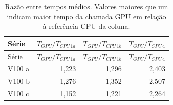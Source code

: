 \begin{longtable}{lrrr}
\caption{Razão entre tempos médios. Valores maiores que um indicam maior tempo da chamada GPU em relação à referência CPU da coluna.}\label{tab:comparacao}\\
\toprule Série & $T_{GPU}/T_{CPU\,1a}$ & $T_{GPU}/T_{CPU\,1b}$ & $T_{GPU}/T_{CPU\,4}$\\
\midrule\endfirsthead
\toprule Série & $T_{GPU}/T_{CPU\,1a}$ & $T_{GPU}/T_{CPU\,1b}$ & $T_{GPU}/T_{CPU\,4}$\\
\midrule\endhead
\bottomrule\endfoot
V100 a & 1,223 & 1,296 & 2,403\\
V100 b & 1,276 & 1,352 & 2,507\\
V100 c & 1,152 & 1,221 & 2,264\\
\end{longtable}
